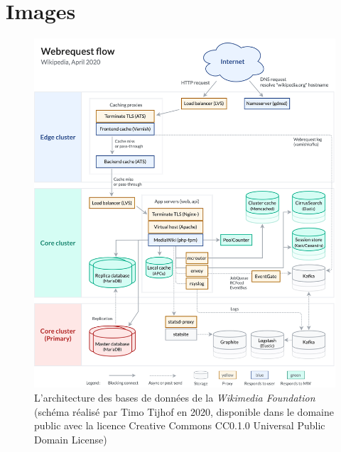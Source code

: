 \chapter{Images}
\begin{figure}[p]
	\includegraphics[width=\textwidth]{annexes/wikimedia_db_2020.png}
	\caption{L'architecture des bases de données de la \textit{Wikimedia Foundation} (schéma réalisé par Timo Tijhof en 2020, disponible dans le domaine public avec la licence Creative Commons CC0.1.0 Universal Public Domain License)}
	\label{appendix:wikimedia_db}
\end{figure}